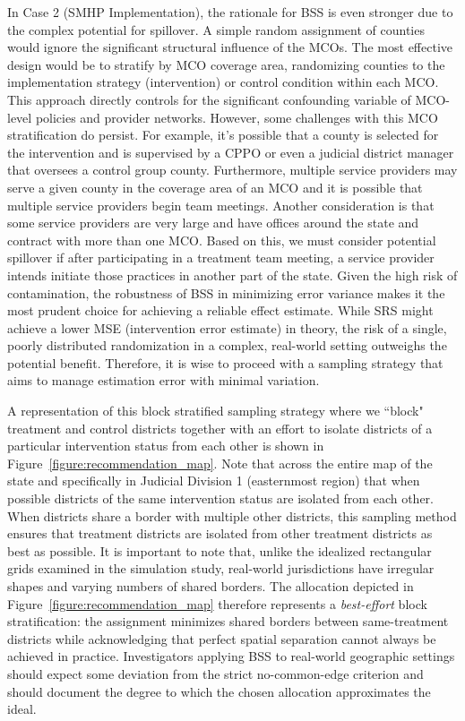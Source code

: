 \documentclass{article}[11pt]
\begin{document}
In Case 2 (SMHP Implementation), the rationale for BSS is even stronger due to the complex potential for spillover. A simple random assignment of counties would ignore the significant structural influence of the MCOs. The most effective design would be to stratify by MCO coverage area, randomizing counties to the implementation strategy (intervention) or control condition within each MCO. This approach directly controls for the significant confounding variable of MCO-level policies and provider networks. However, some challenges with this MCO stratification do persist. For example, it's possible that a county is selected for the intervention and is supervised by a CPPO or even a judicial district manager that oversees a control group county. Furthermore, multiple service providers may serve a given county in the coverage area of an MCO and it is possible that multiple service providers begin team meetings. Another consideration is that some service providers are very large and have offices around the state and contract with more than one MCO. Based on this, we must consider potential spillover if after participating in a treatment team meeting, a service provider intends initiate those practices in another part of the state. Given the high risk of contamination, the robustness of BSS in minimizing error variance makes it the most prudent choice for achieving a reliable effect estimate. While SRS might achieve a lower MSE (intervention error estimate) in theory, the risk of a single, poorly distributed randomization in a complex, real-world setting outweighs the potential benefit. Therefore, it is wise to proceed with a sampling strategy that aims to manage estimation error with minimal variation.

A representation of this block stratified sampling strategy where we ``block" treatment and control districts together with an effort to isolate districts of a particular intervention status from each other is shown in Figure~\ref{figure:recommendation_map}. Note that across the entire map of the state and specifically in Judicial Division 1 (easternmost region) that when possible districts of the same intervention status are isolated from each other. When districts share a border with multiple other districts, this sampling method ensures that treatment districts are isolated from other treatment districts as best as possible. It is important to note that, unlike the idealized rectangular grids examined in the simulation study, real-world jurisdictions have irregular shapes and varying numbers of shared borders. The allocation depicted in Figure~\ref{figure:recommendation_map} therefore represents a \textit{best-effort} block stratification: the assignment minimizes shared borders between same-treatment districts while acknowledging that perfect spatial separation cannot always be achieved in practice. Investigators applying BSS to real-world geographic settings should expect some deviation from the strict no-common-edge criterion and should document the degree to which the chosen allocation approximates the ideal.
\end{document}
